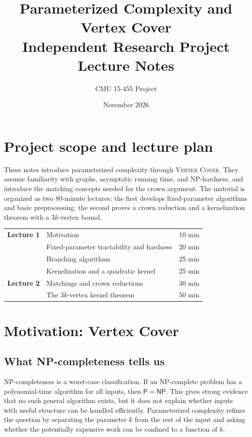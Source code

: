 \documentclass[11pt]{article}
\title{Parameterized Complexity and Vertex Cover\\\large Independent Research Project Lecture Notes}
\author{CMU 15-455 Project}
\date{November 2026}
\newcommand{\VC}{\textsc{Vertex Cover}}
\begin{document}
\maketitle
\tableofcontents

\section*{Project scope and lecture plan}

These notes introduce parameterized complexity through \VC. They assume familiarity with graphs, asymptotic running time, and NP-hardness, and introduce the matching concepts needed for the crown argument. The material is organized as two 80-minute lectures: the first develops fixed-parameter algorithms and basic preprocessing; the second proves a crown reduction and a kernelization theorem with a $3k$-vertex bound.

\begin{center}
\begin{tabular}{llr}
\textbf{Lecture 1} & Motivation & 10 min \\
                   & Fixed-parameter tractability and hardness & 20 min \\
                   & Branching algorithms & 25 min \\
                   & Kernelization and a quadratic kernel & 25 min \\
\textbf{Lecture 2} & Matchings and crown reductions & 30 min \\
                   & The $3k$-vertex kernel theorem & 50 min
\end{tabular}
\end{center}

\section{Motivation: Vertex Cover}

\subsection{What NP-completeness tells us}

NP-completeness is a worst-case classification. If an NP-complete problem has a polynomial-time algorithm for all inputs, then $\mathsf{P}=\mathsf{NP}$. This gives strong evidence that no such general algorithm exists, but it does not explain whether inputs with useful structure can be handled efficiently. Parameterized complexity refines the question by separating the parameter $k$ from the rest of the input and asking whether the potentially expensive work can be confined to a function of $k$.
\end{document}
